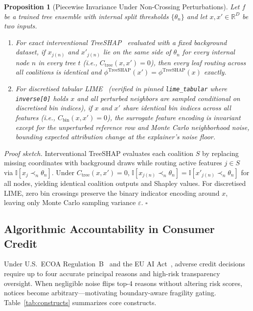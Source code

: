 \documentclass[conference]{IEEEtran}
\newtheorem{proposition}{Proposition}
\begin{document}
\begin{proposition}[Piecewise Invariance Under Non-Crossing Perturbations]
\label{prop:p1}
Let $f$ be a trained tree ensemble with internal split thresholds $\{\theta_n\}$ and let $x, x' \in \mathbb{R}^D$ be two inputs.
\begin{enumerate}
    \item[(i)] For exact interventional TreeSHAP~\cite{lundberg2020} evaluated with a fixed background dataset, if $x_{j(n)}$ and $x'_{j(n)}$ lie on the same side of $\theta_n$ for every internal node $n$ in every tree $t$ (i.e., $C_{\mathrm{tree}}(x,x') = 0$), then every leaf routing across all coalitions is identical and $\phi^{\mathrm{TreeSHAP}}(x') = \phi^{\mathrm{TreeSHAP}}(x)$ exactly.
    \item[(ii)] For discretised tabular LIME~\cite{ribeiro2016} (verified in pinned \texttt{lime\_tabular} where \texttt{inverse[0]} holds $x$ and all perturbed neighbors are sampled conditional on discretised bin indices), if $x$ and $x'$ share identical bin indices across all features (i.e., $C_{\mathrm{bin}}(x,x') = 0$), the surrogate feature encoding is invariant except for the unperturbed reference row and Monte Carlo neighborhood noise, bounding expected attribution change at the explainer's noise floor.
\end{enumerate}
\end{proposition}

\noindent\textit{Proof sketch.} Interventional TreeSHAP evaluates each coalition $S$ by replacing missing coordinates with background draws while routing active features $j{\in}S$ via $\mathbb{I}[x_j \prec_n \theta_n]$. Under $C_{\mathrm{tree}}(x,x'){=}0$, $\mathbb{I}[x_{j(n)}{\prec_n}\theta_n]{=}\mathbb{I}[x'_{j(n)}{\prec_n}\theta_n]$ for all nodes, yielding identical coalition outputs and Shapley values. For discretised LIME, zero bin crossings preserve the binary indicator encoding around $x$, leaving only Monte Carlo sampling variance $\varepsilon$. $\square$

\subsection{Algorithmic Accountability in Consumer Credit}
Under U.S.\ ECOA Regulation~B~\cite{regb_cfpb} and the EU AI Act~\cite{euaiact2024}, adverse credit decisions require up to four accurate principal reasons and high-risk transparency oversight. When negligible noise flips top-4 reasons without altering risk scores, notices become arbitrary—motivating boundary-aware fragility gating. Table~\ref{tab:constructs} summarizes core constructs.
\end{document}
